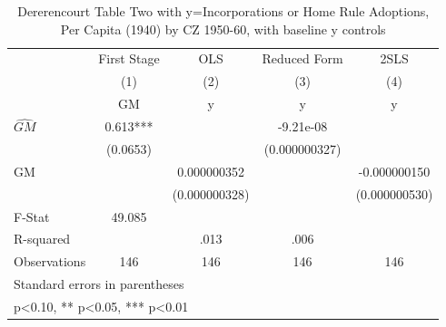 \begin{table}[htbp]\centering
\def\sym#1{\ifmmode^{#1}\else\(^{#1}\)\fi}
\caption{Dererencourt Table Two with y=Incorporations or Home Rule Adoptions, Per Capita (1940) by CZ 1950-60, with baseline y controls}
\begin{tabular}{l*{4}{c}}
\toprule
                    & First Stage   &         OLS   &Reduced Form   &        2SLS   \\
                    &\multicolumn{1}{c}{(1)}&\multicolumn{1}{c}{(2)}&\multicolumn{1}{c}{(3)}&\multicolumn{1}{c}{(4)}\\
                    &\multicolumn{1}{c}{GM}&\multicolumn{1}{c}{y}&\multicolumn{1}{c}{y}&\multicolumn{1}{c}{y}\\
\midrule
$\hat{GM}$          &       0.613***&               &   -9.21e-08   &               \\
                    &    (0.0653)   &               &(0.000000327)   &               \\
\addlinespace
GM                  &               & 0.000000352   &               &-0.000000150   \\
                    &               &(0.000000328)   &               &(0.000000530)   \\
\midrule
F-Stat              &      49.085   &               &               &               \\
R-squared           &               &        .013   &        .006   &               \\
Observations        &         146   &         146   &         146   &         146   \\
\bottomrule
\multicolumn{5}{l}{\footnotesize Standard errors in parentheses}\\
\multicolumn{5}{l}{\footnotesize * p<0.10, ** p<0.05, *** p<0.01}\\
\end{tabular}
\end{table}
